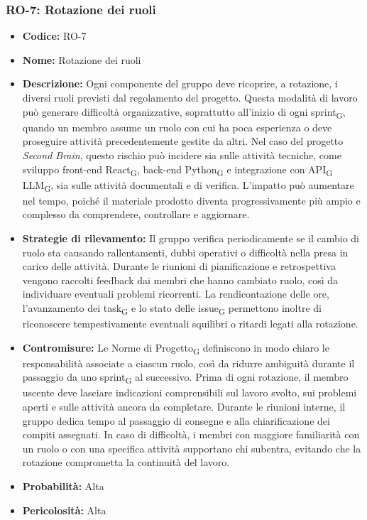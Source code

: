 \documentclass[a4paper, 10pt, colorlinks=true, linkcolor=black, urlcolor=blue, citecolor=blue, hidelinks]{article}
\begin{document}
\subsubsection{RO-7: Rotazione dei ruoli}

\begin{itemize}
    \item \textbf{Codice:} RO-7

    \item \textbf{Nome:} Rotazione dei ruoli

    \item \textbf{Descrizione:} Ogni componente del gruppo deve ricoprire, a rotazione, i diversi ruoli previsti dal regolamento del progetto. Questa modalità di lavoro può generare difficoltà organizzative, soprattutto all'inizio di ogni sprint\textsubscript{G}, quando un membro assume un ruolo con cui ha poca esperienza o deve proseguire attività precedentemente gestite da altri. Nel caso del progetto \textit{Second Brain}, questo rischio può incidere sia sulle attività tecniche, come sviluppo front-end React\textsubscript{G}, back-end Python\textsubscript{G} e integrazione con API\textsubscript{G} LLM\textsubscript{G}, sia sulle attività documentali e di verifica. L'impatto può aumentare nel tempo, poiché il materiale prodotto diventa progressivamente più ampio e complesso da comprendere, controllare e aggiornare.

    \item \textbf{Strategie di rilevamento:} Il gruppo verifica periodicamente se il cambio di ruolo sta causando rallentamenti, dubbi operativi o difficoltà nella presa in carico delle attività. Durante le riunioni di pianificazione e retrospettiva vengono raccolti feedback dai membri che hanno cambiato ruolo, così da individuare eventuali problemi ricorrenti. La rendicontazione delle ore, l'avanzamento dei task\textsubscript{G} e lo stato delle issue\textsubscript{G} permettono inoltre di riconoscere tempestivamente eventuali squilibri o ritardi legati alla rotazione.

    \item \textbf{Contromisure:} Le Norme di Progetto\textsubscript{G} definiscono in modo chiaro le responsabilità associate a ciascun ruolo, così da ridurre ambiguità durante il passaggio da uno sprint\textsubscript{G} al successivo. Prima di ogni rotazione, il membro uscente deve lasciare indicazioni comprensibili sul lavoro svolto, sui problemi aperti e sulle attività ancora da completare. Durante le riunioni interne, il gruppo dedica tempo al passaggio di consegne e alla chiarificazione dei compiti assegnati. In caso di difficoltà, i membri con maggiore familiarità con un ruolo o con una specifica attività supportano chi subentra, evitando che la rotazione comprometta la continuità del lavoro.

    \item \textbf{Probabilità:} Alta

    \item \textbf{Pericolosità:} Alta
\end{itemize}
\end{document}

